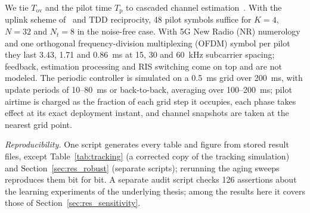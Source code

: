We tie $T_{\mathrm{ov}}$ and the pilot time $T_{\mathrm{p}}$ to cascaded channel estimation~\cite{Zheng2022COMST}. With the uplink scheme of~\cite{Wang2020TWC} and TDD reciprocity, 48 pilot symbols suffice for $K=4$, $N=32$ and $N_t=8$ in the noise-free case. With 5G New Radio (NR) numerology~\cite{3gpp_nr_phy} and one orthogonal frequency-division multiplexing (OFDM) symbol per pilot they last 3.43, 1.71 and 0.86~ms at 15, 30 and 60~kHz subcarrier spacing; feedback, estimation processing and RIS switching come on top and are not modeled. The periodic controller is simulated on a 0.5~ms grid over 200~ms, with update periods of 10--80~ms or back-to-back, averaging over 100--200~ms; pilot airtime is charged as the fraction of each grid step it occupies, each phase takes effect at its exact deployment instant, and channel snapshots are taken at the nearest grid point.

\emph{Reproducibility.} One script generates every table and figure from stored result files, except Table~\ref{tab:tracking} (a corrected copy of the tracking simulation) and Section~\ref{sec:res_robust} (separate scripts); rerunning the aging sweeps reproduces them bit for bit. A separate audit script checks 126 assertions about the learning experiments of the underlying thesis; among the results here it covers those of Section~\ref{sec:res_sensitivity}.
